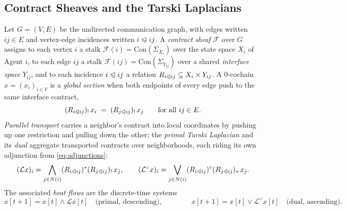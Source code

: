\documentclass[10pt]{article}
\newcommand{\face}{\trianglelefteqslant}
\newcommand{\shf}{\mathscr{F}}
\newcommand{\Lap}{\mathcal{L}}
\newcommand{\coLap}{\mathcal{L}^{\scriptscriptstyle\vee}}
\newcommand{\Con}[1]{\text{Con}(#1)}
\theoremstyle{definition}
\theoremstyle{remark}
\begin{document}
\subsection{Contract Sheaves and the Tarski Laplacians}
\label{sec:sheaves}

Let $G = (V, E)$ be the undirected communication graph, with edges written $ij \in E$ and vertex-edge incidences written $i \face ij$. A \emph{contract sheaf} $\shf$ over $G$ assigns to each vertex $i$ a stalk $\shf(i) = \Con{\Sigma_{X_i}}$ over the state space $X_i$ of Agent $i$, to each edge $ij$ a stalk $\shf(ij) = \Con{\Sigma_{Y_{ij}}}$ over a shared \emph{interface space} $Y_{ij}$, and to each incidence $i \face ij$ a relation $R_{i \face ij} \subseteq X_i \times Y_{ij}$.
A 0-cochain $x = (x_i)_{i \in V}$ is a \emph{global section} when both endpoints of every edge push to the same interface contract,
\begin{equation}
\label{eq:section}
(R_{i \face ij})_{!}\, x_i \;=\; (R_{j \face ij})_{!}\, x_j
\qquad \text{for all } ij \in E.
\end{equation}
\emph{Parallel transport} carries a neighbor's contract into local coordinates by pushing up one restriction and pulling down the other; the \emph{primal Tarski Laplacian} and its \emph{dual} aggregate transported contracts over neighborhoods, each riding its own adjunction from \eqref{eq:adjunctions}:
\begin{equation}
\label{eq:laplacian}
(\Lap x)_i = \bigwedge_{j \in N(i)} (R_{i \face ij})^{\ast} (R_{j \face ij})_{!}\, x_j,
\qquad
(\coLap x)_i = \bigvee_{j \in N(i)} (R_{i \face ij})^{\circ} (R_{j \face ij})_{\ast}\, x_j.
\end{equation}
The associated \emph{heat flows} are the discrete-time systems
\begin{equation}
\label{eq:flows}
x[t+1] = x[t] \wedge \Lap x[t] \quad \text{(primal, descending)},
\qquad\qquad
x[t+1] = x[t] \vee \coLap x[t] \quad \text{(dual, ascending)}.
\end{equation}
\end{document}
